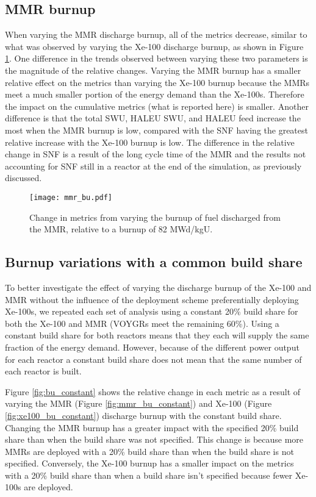 \subsection{MMR burnup}
When varying the \gls{MMR} discharge burnup, all of the metrics decrease, similar 
to what was observed by varying the Xe-100 discharge burnup, as shown in 
Figure \ref{fig:mmr_bu_s7}. One difference in 
the trends observed between varying these two parameters is the magnitude of 
the relative changes. Varying the \gls{MMR} burnup has a smaller relative effect 
on the metrics than varying the Xe-100 burnup because the \glspl{MMR}
meet a much smaller portion of the energy demand than the Xe-100s.
Therefore the impact on the cumulative metrics 
(what is reported here) is smaller. Another difference is that the total 
\gls{SWU}, \gls{HALEU} \gls{SWU}, and \gls{HALEU} feed increase the most 
when the \gls{MMR} burnup is low, compared with the \gls{SNF} having the 
greatest relative increase with the Xe-100 burnup is low. The difference 
in the relative change in \gls{SNF} is a result of the long cycle 
time of the \gls{MMR} and the results not accounting for 
\gls{SNF} still in a reactor at the end of the simulation, 
as previously discussed. 

\begin{figure}[h!]
    \centering
    \texttt{[image: mmr\_bu.pdf]}
    \caption{Change in metrics from varying the burnup of fuel 
    discharged from the MMR, relative to a burnup of 82 MWd/kgU.}
    \label{fig:mmr_bu_s7}
\end{figure}

\subsection{Burnup variations with a common build share}
To better investigate the effect of varying the discharge burnup of the Xe-100 
and \gls{MMR} without the influence of the deployment scheme preferentially
deploying Xe-100s, we repeated each set of analysis using a constant 20\% 
build share for both the Xe-100 and \gls{MMR} (VOYGRs meet the remaining 60\%). 
Using a constant build share for 
both reactors means that they each will supply the same fraction of the energy demand.
However, because of the different power output for each reactor a constant build 
share does not mean that the same number of each reactor is built. 

Figure \ref{fig:bu_constant} shows the relative change in each metric as a result 
of varying the \gls{MMR} (Figure \ref{fig:mmr_bu_constant}) and Xe-100 
(Figure \ref{fig:xe100_bu_constant}) discharge burnup with the constant build 
share. Changing the \gls{MMR} burnup has a greater impact with the specified 20\% 
build share than when the build share was not specified. This change is because 
more \glspl{MMR} are deployed with a 20\% build share than when the build share is 
not specified. Conversely, the Xe-100 burnup has a smaller impact on the metrics 
with a 20\% build share than when a build share isn't specified because fewer 
Xe-100s are deployed. 

